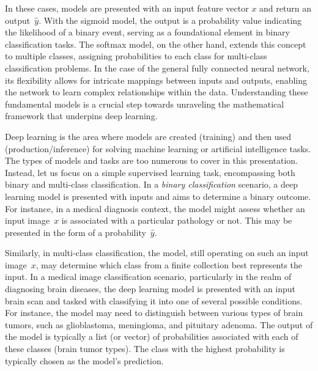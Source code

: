 \documentclass[12pt]{article}
\begin{document}
In these cases, models are presented with an input feature vector $x$ and return an output~$\hat{y}$. With the sigmoid model, the output is a probability value indicating the likelihood of a binary event, serving as a foundational element in binary classification tasks. The softmax model, on the other hand, extends this concept to multiple classes, assigning probabilities to each class for multi-class classification problems. In the case of the general fully connected neural network, its flexibility allows for intricate mappings between inputs and outputs, enabling the network to learn complex relationships within the data. Understanding these fundamental models is a crucial step towards unraveling the mathematical framework that underpins deep learning.

Deep learning is the area where models are created (training) and then used (production/inference) for solving machine learning or artificial intelligence tasks. The types of models and tasks are too numerous to cover in this presentation. Instead, let us focus on a simple supervised learning task, encompassing both binary and multi-class classification. In a {\em binary classification} scenario, a deep learning model is presented with inputs and aims to determine a binary outcome. For instance, in a medical diagnosis context, the model might assess whether an  input image~$x$ is associated with a particular pathology or not. This may be presented in the form of a probability~$\hat{y}$.

Similarly, in multi-class classification, the model, still operating on such an input image~$x$, may determine which class from a finite collection best represents the input. In a medical image classification scenario, particularly in the realm of diagnosing brain diseases, the deep learning model is presented with an input brain scan and tasked with classifying it into one of several possible conditions. For instance, the model may need to distinguish between various types of brain tumors, such as glioblastoma, meningioma, and pituitary adenoma. The output of the model is typically a list (or vector) of probabilities associated with each of these classes (brain tumor types). The class with the highest probability is typically chosen as the model's prediction.
\end{document}
